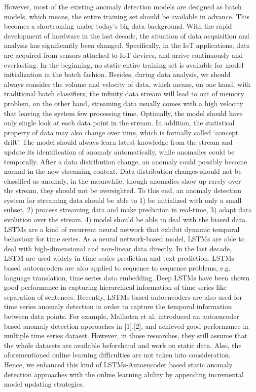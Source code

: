 However, most of the existing anomaly detection models are designed as batch models, which means, the entire training set should be available in advance. This becomes a shortcoming under today’s big data background. With the rapid development of hardware in the last decade, the situation of data acquisition and analysis has significantly been changed. Specifically, in the IoT applications, data are acquired from sensors attached to IoT devices, and arrive continuously and everlasting. In the beginning, no static entire training set is available for model initialization in the batch fashion. Besides, during data analysis, we should always consider the volume and velocity of data, which means, on one hand, with traditional batch classifiers, the infinity data stream will lead to out of memory problem, on the other hand, streaming data usually comes with a high velocity that leaving the system few processing time. Optimally, the model should have only single look at each data point in the stream. In addition, the statistical property of data may also change over time, which is formally called ‘concept drift’. The model should always learn latest knowledge from the stream and update its identification of anomaly automatically, while anomalies could be temporally. After a data distribution change, an anomaly could possibly become normal in the new streaming context. Data distribution changes should not be classified as anomaly, in the meanwhile, though anomalies show up rarely over the stream, they should not be oversighted. To this end, an anomaly detection system for streaming data should be able to 1) be initialized with only a small subset, 2) process streaming data and make prediction in real-time, 3) adapt data evolution over the stream. 4) model should be able to deal with the biased data.\\

LSTMs are a kind of recurrent neural network that exhibit dynamic temporal behaviour for time series. As a neural network-based model, LSTMs are able to deal with high-dimensional and non-linear data directly. In the last decade, LSTM are used widely in time series prediction and text prediction. LSTMs-based autoencoders are also applied to sequence to sequence problems, e.g. language translation, time series data embedding. Deep LSTMs have been shown good performance in capturing hierarchical information of time series like separation of sentences. Recently, LSTMs-based autoencoders are also used for time series anomaly detection in order to capture the temporal information between data points. For example, Malhotra et al. introduced an autoencoder based anomaly detection approaches in [1],[2], and achieved good performance in multiple time series dataset. However, in those researches, they still assume that the whole datasets are available beforehand and work on static data. Also, the aforementioned online learning difficulties are not taken into consideration. Hence, we enhanced this kind of LSTMs-Autoencoder based static anomaly detection approaches with the online learning ability by appending incremental model updating strategies.\\

